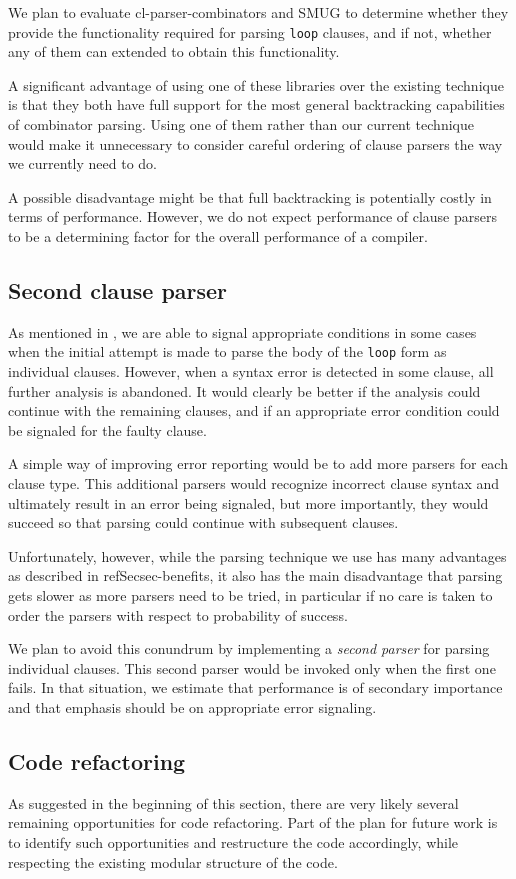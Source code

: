 We plan to evaluate cl-parser-combinators and SMUG to determine
whether they provide the functionality required for parsing
\texttt{loop} clauses, and if not, whether any of them can extended to
obtain this functionality.

A significant advantage of using one of these libraries over the
existing technique is that they both have full support for the most
general backtracking capabilities of combinator parsing.  Using one of
them rather than our current technique would make it unnecessary to
consider careful ordering of clause parsers the way we currently need
to do.

A possible disadvantage might be that full backtracking is potentially
costly in terms of performance.  However, we do not expect performance
of clause parsers to be a determining factor for the overall
performance of a \commonlisp{} compiler.

\subsection{Second clause parser}

As mentioned in , we are able to signal
appropriate conditions in some cases when the initial attempt is made
to parse the body of the \texttt{loop} form as individual clauses.
However, when a syntax error is detected in some clause, all further
analysis is abandoned.  It would clearly be better if the analysis
could continue with the remaining clauses, and if an appropriate error
condition could be signaled for the faulty clause.

A simple way of improving error reporting would be to add more parsers
for each clause type.  This additional parsers would recognize
incorrect clause syntax and ultimately result in an error being
signaled, but more importantly, they would succeed so that parsing
could continue with subsequent clauses.

Unfortunately, however, while the parsing technique we use has many
advantages as described in refSec{sec-benefits}, it also has the main
disadvantage that parsing gets slower as more parsers need to be
tried, in particular if no care is taken to order the parsers with
respect to probability of success.

We plan to avoid this conundrum by implementing a \emph{second parser}
for parsing individual clauses.  This second parser would be invoked
only when the first one fails.  In that situation, we estimate that
performance is of secondary importance and that emphasis should be on
appropriate error signaling.

\subsection{Code refactoring}

As suggested in the beginning of this section, there are very likely
several remaining opportunities for code refactoring.  Part of the
plan for future work is to identify such opportunities and restructure
the code accordingly, while respecting the existing modular structure
of the code.
